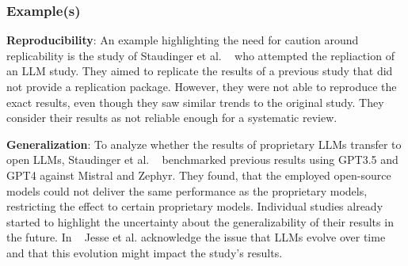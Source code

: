 \subsubsection{Example(s)}
\textbf{Reproducibility}:
An example highlighting the need for caution around replicability is the study of Staudinger et al. ~\cite{DBLP:conf/sigir-ap/StaudingerKPLH24} who attempted the repliaction of an LLM study. They aimed to replicate the results of a previous study that did not provide a replication package. However, they were not able to reproduce the exact results, even though they saw similar trends to the original study. They consider their results as not reliable enough for a systematic review.

\textbf{Generalization}:
To analyze whether the results of proprietary LLMs transfer to open LLMs, Staudinger et al. ~\cite{DBLP:conf/sigir-ap/StaudingerKPLH24} benchmarked previous results using GPT3.5 and GPT4 against Mistral and Zephyr. They found, that the employed open-source models could not deliver the same performance as the proprietary models, restricting the effect to certain proprietary models.
Individual studies already started to highlight the uncertainty about the generalizability of their results in the future. In ~\cite{DBLP:conf/msr/JesseADM23} Jesse et al. acknowledge the issue that LLMs evolve over time and that this evolution might impact the study's results.

